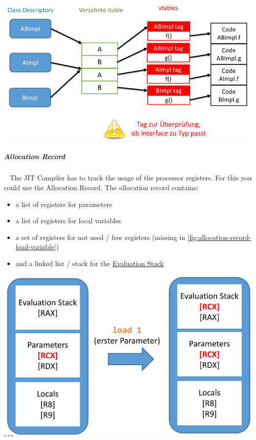 \documentclass[12pt,twoside,landscape]{extarticle}
\begin{document}
\begin{multicols}{4}
{
\begin{center}
\includegraphics[width=.9\linewidth]{img/total_interface_support.png}
\end{center}
\label{fig:total-interface-support}
}

\subparagraph{Allocation Record} \
\label{sec:org8dd2ec7}
The JIT Compiler has to track the usage of the processor registers.
For this you could use the Allocation Record.
The allocation record contains:
\begin{itemize}
\item a list of registers for parameters
\item a list of registers for local variables
\item a set of registers for not used / free registers (missing in \autoref{fig:allocation-record-load-variable})
\item and a linked list / stack for the \href{../../../roam/20221230171752-what_is_a_evaluation_stack.org}{Evaluation Stack}
\end{itemize}


{
\begin{center}
\includegraphics[width=.9\linewidth]{img/allocation_record_load_var.png}
\end{center}
\label{fig:allocation-record-load-variable}
}

\end{multicols}
\end{document}
